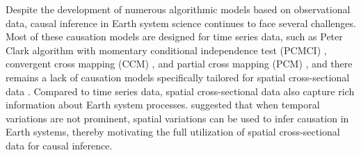 \documentclass[authoryear,preprint,review,12pt]{elsarticle}
\begin{document}
Despite the development of numerous algorithmic models based on observational data, causal inference in Earth system science continues to face several challenges. Most of these causation models are designed for time series data, such as Peter Clark algorithm with momentary conditional independence test (PCMCI) \citep{runge2019pcmci}, convergent cross mapping (CCM) \citep{sugihara2012ccm}, and partial cross mapping (PCM) \citep{leng2020pcm}, and there remains a lack of causation models specifically tailored for spatial cross-sectional data \citep{gao2022ciss,gao2023gccm}. Compared to time series data, spatial cross-sectional data also capture rich information about Earth system processes. \cite{gao2022tscess} suggested that when temporal variations are not prominent, spatial variations can be used to infer causation in Earth systems, thereby motivating the full utilization of spatial cross-sectional data for causal inference.
\end{document}
